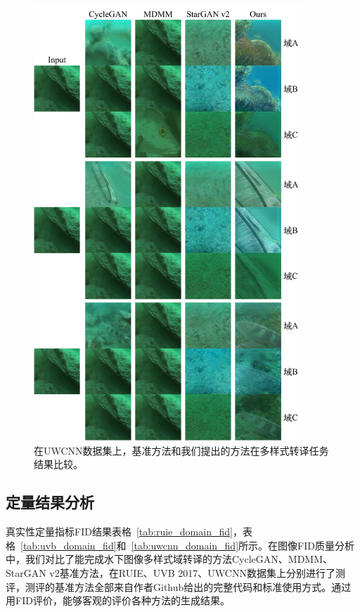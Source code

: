\begin{figure}[htp]
    \centering
  \includegraphics[width=0.9\textwidth]{figures/comparison_ruie_domain.pdf}
  \caption{在UWCNN数据集上，基准方法和我们提出的方法在多样式转译任务结果比较。}
  \label{fig:comparison_uwcnn_domain}
\end{figure}

\subsection{定量结果分析}
真实性定量指标FID结果表格~\ref{tab:ruie_domain_fid}，表格~\ref{tab:uvb_domain_fid}和~\ref{tab:uwcnn_domain_fid}所示。在图像FID质量分析中，我们对比了能完成水下图像多样式域转译的方法CycleGAN、MDMM、StarGAN v2基准方法，在RUIE、UVB 2017、UWCNN数据集上分别进行了测评，测评的基准方法全部来自作者Github给出的完整代码和标准使用方式。通过用FID评价，能够客观的评价各种方法的生成结果。

